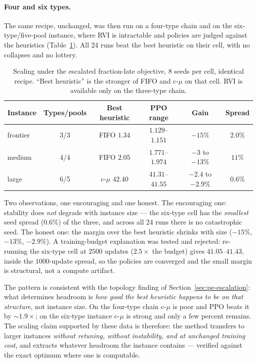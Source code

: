 \documentclass[11pt,a4paper]{article}
\begin{document}
\paragraph{Four and six types.}
The same recipe, unchanged, was then run on a four-type chain and on the
six-type/five-pool instance, where RVI is intractable and policies are
judged against the heuristics (Table~\ref{tab:scaling}).  All 24 runs
beat the best heuristic on their cell, with no collapses and no lottery.

\begin{table}[h]
\centering
\caption{Scaling under the escalated fraction-late objective, 8 seeds per
cell, identical recipe.  ``Best heuristic'' is the stronger of FIFO and
c-$\mu$ on that cell.  RVI is available only on the three-type chain.}
\label{tab:scaling}
\begin{tabular}{lccccc}
\toprule
Instance & Types/pools & Best heuristic & PPO range & Gain & Spread \\
\midrule
frontier & 3/3 & FIFO $1.34$   & $1.129$--$1.151$ & $-15\%$ & $2.0\%$ \\
medium   & 4/4 & FIFO $2.05$   & $1.771$--$1.974$ & $-3$ to $-13\%$ & $11\%$ \\
large    & 6/5 & c-$\mu$ $42.40$ & $41.31$--$41.55$ & $-2.4$ to $-2.9\%$ & $0.6\%$ \\
\bottomrule
\end{tabular}
\end{table}

Two observations, one encouraging and one honest.  The encouraging one:
stability does \emph{not} degrade with instance size --- the six-type
cell has the \emph{smallest} seed spread ($0.6\%$) of the three, and
across all 24 runs there is no catastrophic seed.  The honest one: the
margin over the best heuristic shrinks with size ($-15\%$, $-13\%$,
$-2.9\%$).  A training-budget explanation was tested and rejected:
re-running the six-type cell at $2500$ updates ($2.5\times$ the budget)
gives $41.05$--$41.43$, inside the $1000$-update spread, so the policies
are converged and the small margin is structural, not a compute artifact.

The pattern is consistent with the topology finding of
Section~\ref{sec:pe-escalation}: what determines headroom is \emph{how
good the best heuristic happens to be on that structure}, not instance
size.  On the four-type chain c-$\mu$ is poor and PPO beats it by
$\sim1.9\times$; on the six-type instance c-$\mu$ is strong and only a
few percent remains.  The scaling claim supported by these data is
therefore: the method transfers to larger instances \emph{without
retuning, without instability, and at unchanged training cost}, and
extracts whatever headroom the instance contains --- verified against the
exact optimum where one is computable.
\end{document}
